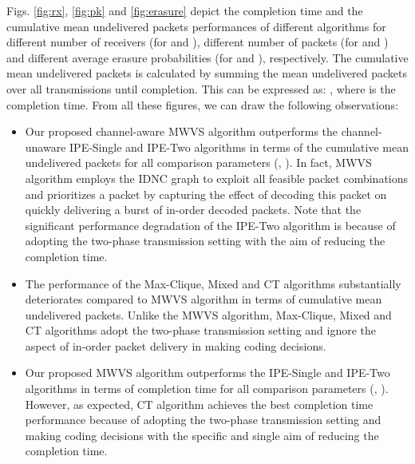 \documentclass[12pt, peerreview, onecolumn]{IEEEtran}
\begin{document}
Figs. \ref{fig:rx},  \ref{fig:pk} and  \ref{fig:erasure}  depict the completion time  and the  cumulative mean undelivered packets performances of different algorithms for different  number of receivers  (for  and ),  different number of packets  (for  and ) and different average erasure probabilities  (for  and ),  respectively.\footnotemark {}  The  cumulative mean undelivered packets
is calculated by summing  the mean undelivered packets over all transmissions until completion. This can be expressed as: , where  is the completion time.   From all these figures, we can draw the following observations:
\begin{itemize}
\item Our proposed channel-aware MWVS algorithm outperforms the channel-unaware  IPE-Single and IPE-Two  algorithms in terms of the cumulative mean undelivered packets for all comparison parameters (, ).
    In fact,  MWVS algorithm employs the IDNC graph  to exploit  all  feasible packet combinations  and prioritizes a packet  by capturing the effect of decoding this packet on  quickly delivering a burst of in-order decoded packets. Note that the significant performance degradation  of the IPE-Two algorithm is because of adopting the two-phase transmission setting with the aim  of reducing the completion time.
\item  The performance of the Max-Clique, Mixed and CT algorithms substantially deteriorates  compared to MWVS algorithm in terms of cumulative mean undelivered packets. Unlike the MWVS  algorithm, Max-Clique, Mixed and CT algorithms adopt the two-phase transmission setting and ignore the aspect of in-order packet delivery  in making coding decisions.
\item Our proposed MWVS algorithm outperforms the IPE-Single and IPE-Two  algorithms in terms of completion time for all comparison parameters (,  ).  However,  as expected, CT algorithm achieves the best completion time performance because of  adopting the two-phase  transmission setting and making coding decisions with the specific and single aim of  reducing the completion time.
\end{itemize}





\vspace{-5mm}
\end{document}
